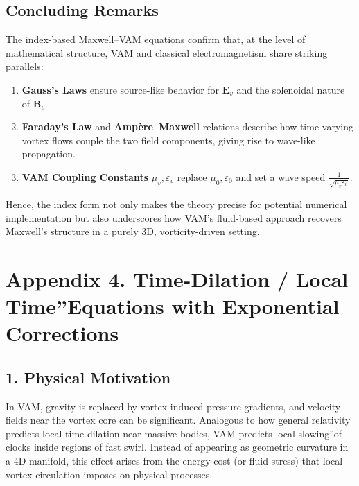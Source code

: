 \documentclass[a4paper,12pt]{article}
\begin{document}
\subsection{Concluding Remarks}

The index-based Maxwell--VAM equations confirm that, at the level of mathematical structure, VAM and classical electromagnetism share striking parallels:

\begin{enumerate}
    \item \textbf{Gauss's Laws} ensure source-like behavior for \(\mathbf{E}_v\) and the solenoidal nature of \(\mathbf{B}_v\).
    \item \textbf{Faraday's Law} and \textbf{Ampère--Maxwell} relations describe how time-varying vortex flows couple the two field components, giving rise to wave-like propagation.
    \item \textbf{VAM Coupling Constants} \(\mu_v, \varepsilon_v\) replace \(\mu_0, \varepsilon_0\) and set a wave speed \(\frac{1}{\sqrt{\mu_v\varepsilon_v}}\).
\end{enumerate}

Hence, the index form not only makes the theory precise for potential numerical implementation but also underscores how VAM's fluid-based approach recovers Maxwell's structure in a purely 3D, vorticity-driven setting.
\label{appendix:maxwell_appendix}


\section*{Appendix 4. Time-Dilation / \grqq Local Time\textquotedblright Equations with Exponential Corrections}

\subsection*{1. Physical Motivation}

In VAM, gravity is replaced by vortex-induced pressure gradients, and velocity fields near the vortex core can be significant. Analogous to how general relativity predicts local time dilation near massive bodies, VAM predicts local \grqq slowing\textquotedblright of clocks inside regions of fast swirl. Instead of appearing as geometric curvature in a 4D manifold, this effect arises from the energy cost (or fluid stress) that local vortex circulation imposes on physical processes.
\end{document}
